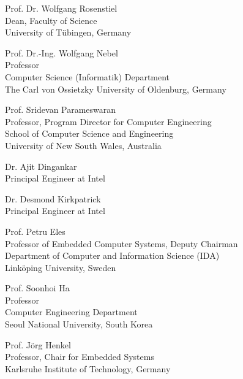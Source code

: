 Prof. Dr. Wolfgang Rosenstiel\\
Dean, Faculty of Science \\
University of T\"{u}bingen, Germany \\
\vspace{5mm}

Prof. Dr.-Ing. Wolfgang Nebel \\
Professor \\
Computer Science (Informatik) Department \\
The Carl von Ossietzky University of Oldenburg, Germany\\
\vspace{5mm}

Prof. Sridevan Parameswaran \\
Professor,  Program Director  for Computer Engineering \\
School of Computer Science and Engineering \\
University of New South Wales, Australia \\
\vspace{5mm}

Dr. Ajit Dingankar \\
Principal Engineer at Intel \\
\vspace{5mm}

Dr. Desmond Kirkpatrick \\
Principal Engineer at Intel \\
\vspace{5mm}

Prof. Petru Eles \\
Professor of Embedded Computer Systems, Deputy Chairman\\
Department of Computer and Information Science (IDA) \\
Link\"{o}ping University,  Sweden\\
\vspace{5mm}

Prof. Soonhoi Ha \\
Professor \\
Computer Engineering Department \\
Seoul National University, South Korea \\
\vspace{5mm}

Prof. J\"{o}rg Henkel \\
Professor, Chair for Embedded Systems \\
Karlsruhe Institute of Technology, Germany \\
\vspace{5mm}

